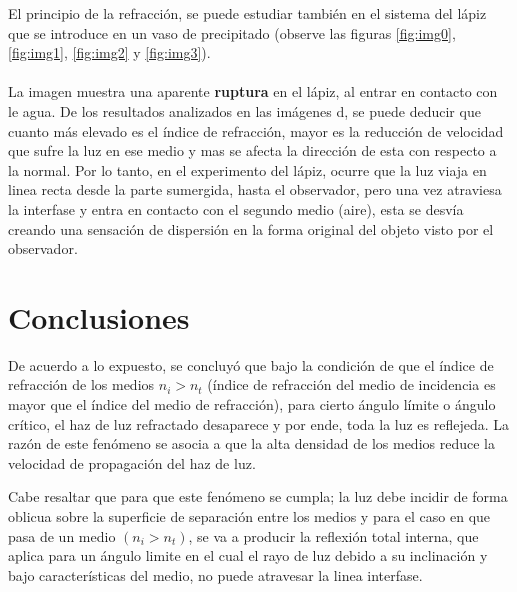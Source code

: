 \documentclass[
aps,
reprint,
amsmath, amssymb,
superscriptaddress,
]{revtex4-2}
\begin{document}
El principio de la refracción, se puede estudiar también en el sistema del lápiz que se introduce en un vaso de precipitado (observe las figuras \ref{fig:img0}, \ref{fig:img1}, \ref{fig:img2} y \ref{fig:img3}).\\
\\
La imagen muestra una aparente \textbf{ruptura} en el lápiz, al entrar en contacto con le agua. De los resultados analizados en las imágenes d, se puede deducir que cuanto más elevado es el índice de refracción, mayor es la reducción de velocidad que sufre la luz en ese medio y mas se afecta la dirección de esta con respecto a la normal. Por lo tanto, en el experimento del lápiz, ocurre que la luz viaja en linea recta desde la parte sumergida, hasta el observador, pero una vez atraviesa la interfase y entra en contacto con el segundo medio (aire), esta se desvía creando una sensación de dispersión en la forma original del objeto visto por el observador.

\section{Conclusiones}

De acuerdo a lo expuesto, se concluyó que bajo la condición de que el índice de refracción de los medios $n_i  > n_t$ (índice de refracción del medio de incidencia es mayor que el índice del medio de refracción), para cierto ángulo límite o ángulo crítico, el haz de luz refractado desaparece y por ende, toda la luz es reflejeda. La razón de este fenómeno se asocia a que la alta densidad de los medios reduce la velocidad de propagación del haz de luz.

Cabe resaltar que para que este fenómeno se cumpla; la luz debe incidir de forma oblicua sobre la superficie de separación entre los medios y para el caso en que pasa de un medio $(n_{i}>n_{t})$, se va a producir la reflexión total interna, que aplica para un ángulo limite en el cual el rayo de luz debido a su inclinación y bajo características del medio, no puede atravesar la linea interfase.




\end{document}

